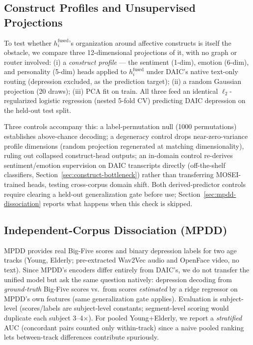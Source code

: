 \documentclass[letterpaper]{article}
\begin{document}
\subsection{Construct Profiles and Unsupervised Projections}
\label{sec:method-profile}

To test whether $h_i^{\text{fused}}$'s organization around affective constructs is itself the obstacle, we compare three 12-dimensional projections of it, with no graph or router involved: (i) a \emph{construct profile} — the sentiment (1-dim), emotion (6-dim), and personality (5-dim) heads applied to $h_i^{\text{fused}}$ under DAIC's native text-only routing (depression excluded, as the prediction target); (ii) a random Gaussian projection (20 draws); (iii) PCA fit on train. All three feed an identical $\ell_2$-regularized logistic regression (nested 5-fold CV) predicting DAIC depression on the held-out test split.

Three controls accompany this: a label-permutation null (1000 permutations) establishes above-chance decoding; a degeneracy control drops near-zero-variance profile dimensions (random projection regenerated at matching dimensionality), ruling out collapsed construct-head outputs; an in-domain control re-derives sentiment/emotion supervision on DAIC transcripts directly (off-the-shelf classifiers, Section~\ref{sec:construct-bottleneck}) rather than transferring MOSEI-trained heads, testing cross-corpus domain shift. Both derived-predictor controls require clearing a held-out generalization gate before use; Section~\ref{sec:mpdd-dissociation} reports what happens when this check is skipped.

\subsection{Independent-Corpus Dissociation (MPDD)}
\label{sec:method-mpdd}

MPDD \citep{fu2025mpdd} provides real Big-Five scores and binary depression labels for two age tracks (Young, Elderly; pre-extracted Wav2Vec audio and OpenFace video, no text). Since MPDD's encoders differ entirely from DAIC's, we do not transfer the unified model but ask the same question natively: depression decoding from \emph{ground-truth} Big-Five scores vs.\ from scores \emph{estimated} by a ridge regressor on MPDD's own features (same generalization gate applies). Evaluation is subject-level (scores/labels are subject-level constants; segment-level scoring would duplicate each subject 3--4$\times$). For pooled Young+Elderly, we report a \emph{stratified} AUC (concordant pairs counted only within-track) since a naive pooled ranking lets between-track differences contribute spuriously.
\end{document}

